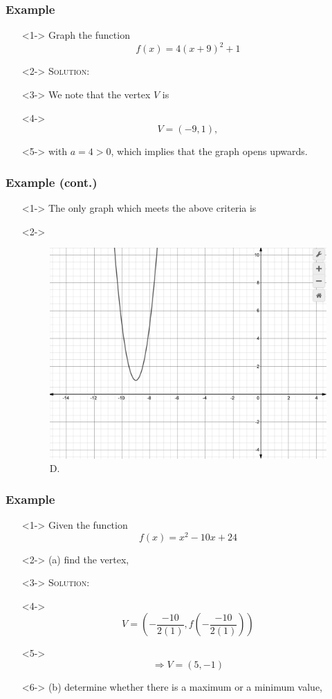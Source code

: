 \documentclass[handout]{beamer}
\begin{document}
\begin{frame}
	\frametitle{Example} 
	\begin{enumerate}
		\item[]<1-> Graph the function 
		\[
			f(x)=4(x+9)^{2}+1
		\]
		\item[]<2-> \textsc{Solution:} 
		\item[]<3-> We note that the vertex $V$ is 
		\item[]<4-> \[ V=(-9, 1), \] 
		\item[]<5-> with $a=4>0$, which implies that the graph opens upwards.  
	\end{enumerate}
\end{frame} 

\begin{frame}
	\frametitle{Example (cont.)} 
	\begin{enumerate} 
		\item[]<1-> The only graph which meets the above criteria is 
		\item[]<2-> 
		\begin{figure} 
			\begin{center}
				\caption{D.}
				\includegraphics[scale=0.2]{3_3_9.png} 	 	
			\end{center} 
		\end{figure} 
	\end{enumerate}
\end{frame}

\begin{frame}
	\frametitle{Example} 
	\begin{enumerate}
		\item[]<1-> Given the function 
		\[
			f(x)=x^{2}-10x+24
		\]
		\item[]<2-> (a) find the vertex, 
		\item[]<3-> \textsc{Solution:} 
		\item[]<4-> \[ V= \left(-\frac{-10}{2(1)}, f \left(-\frac{-10}{2(1)} \right) \right) \] 
		\item[]<5-> \[ \Rightarrow V=\left( 5, -1 \right) \] 
		\item[]<6-> (b) determine whether there is a maximum or a minimum value, 
	\end{enumerate}
\end{frame} 
\end{document}
